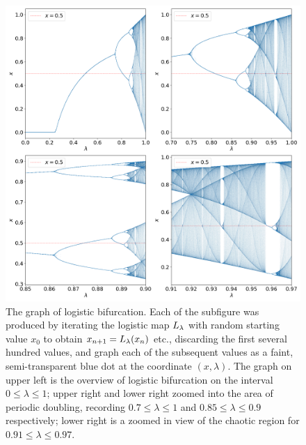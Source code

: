 \begin{figure}[htbp]
	\centering
	\includegraphics[width=\textwidth]{./figures/logistic.png}
	\caption{
		The graph of logistic bifurcation.
		Each of the subfigure was produced by iterating the logistic map $L_{\lambda}$ with random starting value $x_0$ to obtain $x_{n+1} = L_{\lambda}(x_n)$ etc., discarding the first several hundred values, and graph each of the subsequent values as a faint, semi-transparent blue dot at the coordinate $(x, \lambda)$.
		The graph on upper left is the overview of logistic bifurcation on the interval $0 \leq \lambda \leq 1$; upper right and lower right zoomed into the area of periodic doubling, recording $0.7 \leq \lambda \leq 1$ and $0.85 \leq \lambda \leq 0.9$ respectively; lower right is a zoomed in view of the chaotic region for $ 0.91 \leq \lambda \leq 0.97$. 
	}
	\label{fig:logistic bifurcation overview}
\end{figure}

